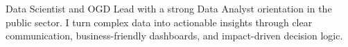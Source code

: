 
\begin{cvparagraph}
Data Scientist and OGD Lead with a strong Data Analyst orientation in the public sector. I turn complex data into actionable insights through clear communication, business-friendly dashboards, and impact-driven decision logic.
\end{cvparagraph}
